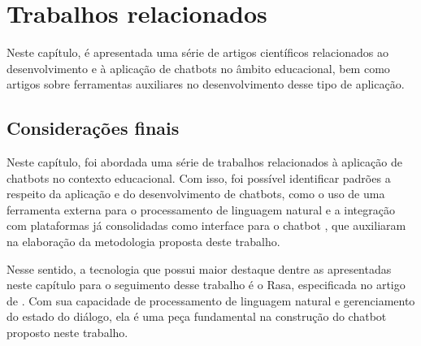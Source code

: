 \chapter{Trabalhos relacionados}
\label{cap:trabalhos-relacionados}

Neste capítulo, é apresentada uma série de artigos científicos relacionados ao desenvolvimento e à aplicação de chatbots no âmbito educacional, bem como artigos sobre ferramentas auxiliares no desenvolvimento desse tipo de aplicação.






\section{Considerações finais}
\label{sec:tr-consideracoes-finais}

Neste capítulo, foi abordada uma série de trabalhos relacionados à aplicação de chatbots no contexto educacional. Com isso, foi possível identificar padrões a respeito da aplicação e do desenvolvimento de chatbots, como o uso de uma ferramenta externa para o processamento de linguagem natural \cite{kaiss2023, briel2021} e a integração com plataformas já consolidadas como interface para o chatbot \cite{kaiss2023}, que auxiliaram na elaboração da metodologia proposta deste trabalho.

Nesse sentido, a tecnologia que possui maior destaque dentre as apresentadas neste capítulo para o seguimento desse trabalho é o Rasa, especificada no artigo de . Com sua capacidade de processamento de linguagem natural e gerenciamento do estado do diálogo, ela é uma peça fundamental na construção do chatbot proposto neste trabalho.
